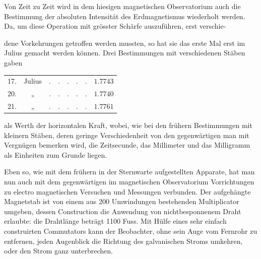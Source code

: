 Von Zeit zu Zeit wird in dem hiesigen magnetischen Observatorium auch die Bestimmung der absoluten Intensität des Erdmagnetismus wiederholt werden. Da, um diese Operation mit grösster Schärfe auszuführen, erst verschie-
\par\GaussVSourceGathering{66\textsuperscript{*}}
\par\clearpage
{}
\noindent dene Vorkehrungen getroffen werden mussten, so hat sie das erste Mal erst im Julius gemacht werden können. Drei Bestimmungen mit verschiedenen Stäben gaben
\begin{center}
\begin{tabular}{@{}rl@{\enspace}*{5}{c}@{\enspace}r@{}}
17. & Julius & . & . & . & . & . & $1.7743$\\
20. & \multicolumn{1}{c}{„} & . & . & . & . & . & $1.7740$\\
21. & \multicolumn{1}{c}{„} & . & . & . & . & . & $1.7761$
\end{tabular}
\end{center}
als Werth der horizontalen Kraft, wobei, wie bei den frühern Bestimmungen mit kleinern Stäben, deren geringe Verschiedenheit von den gegenwärtigen man mit Vergnügen bemerken wird, die Zeitsecunde, das Millimeter und das Milligramm als Einheiten zum Grunde liegen.

Eben so, wie mit dem frühern in der Sternwarte aufgestellten Apparate, hat man nun auch mit dem gegenwärtigen im magnetischen Observatorium Vorrichtungen zu electro magnetischen Versuchen und Messungen verbunden. Der aufgehängte Magnetstab ist von einem aus 200 Umwindungen bestehenden Multiplicator umgeben, dessen Construction die Anwendung von nichtbesponnenem Draht erlaubte: die Drahtlänge beträgt 1100 Fuss. Mit Hülfe eines sehr einfach construirten Commutators kann der Beobachter, ohne sein Auge vom Fernrohr zu entfernen, jeden Augenblick die Richtung des galvanischen Stroms umkehren, oder den Strom ganz unterbrechen.

